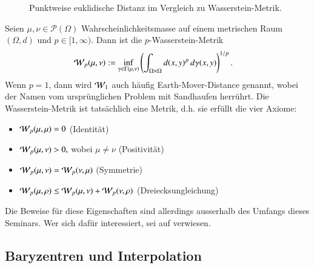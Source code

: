 \begin{figure}
\centering

\caption{Punktweise euklidische Distanz im Vergleich zu Wasserstein-Metrik.}
\label{mongekant:fig:wasserstein}
\end{figure}

Seien $\mu, \nu \in \mathcal{P}(\Omega)$ Wahrscheinlichkeitsmasse
auf einem metrischen Raum $(\Omega, d)$ und $p \in [1, \infty)$.
Dann ist die $p$-Wasserstein-Metrik
\begin{align}
\wasserstein(\mu, \nu)
&:=
\inf_{\gamma \in \Gamma(\mu, \nu)}
\left(
\int_{\Omega \times \Omega} d(x,y)^p\, d\gamma(x,y)
\right)^{1/p}
.
\label{mongekant:eq:wasserstein_metric}
\end{align}
Wenn $p=1$,
dann wird $\wasserstein[1]$ auch häufig Earth-Mover-Distance genannt,
wobei der Namen vom ursprünglichen Problem mit Sandhaufen herrührt.
Die Wasserstein-Metrik ist tatsächlich eine Metrik,
d.h. sie erfüllt die vier Axiome:
\begin{itemize}
\item $\wasserstein(\mu, \mu) = 0$ (Identität)
\item $\wasserstein(\mu, \nu) > 0,$ wobei $\mu \neq \nu$ (Positivität)
\item $\wasserstein(\mu, \nu) = \wasserstein(\nu, \mu)$ (Symmetrie)
\item $\wasserstein(\mu, \rho) \leq \wasserstein(\mu, \nu) + \wasserstein(\nu, \rho)$
(Dreiecksungleichung)
\end{itemize}
Die Beweise für diese Eigenschaften sind allerdings
ausserhalb des Umfangs dieses Seminars.
Wer sich dafür interessiert,
sei auf \cite{mongekant:villani} verwiesen.

\subsection{Baryzentren und Interpolation
\label{mongekant:subsection:interpolation}}

